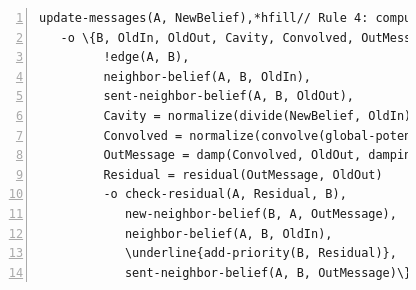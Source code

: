 \begin{figure}[h!]
\begin{Verbatim}[numbers=left,commandchars=\\\{\},fontsize=\codesize]
update-messages(A, NewBelief),*hfill// Rule 4: compute belief to be sent to a neighbor node
   -o \{B, OldIn, OldOut, Cavity, Convolved, OutMessage, Residual |
         !edge(A, B),
         neighbor-belief(A, B, OldIn),
         sent-neighbor-belief(A, B, OldOut),
         Cavity = normalize(divide(NewBelief, OldIn)),
         Convolved = normalize(convolve(global-potential, Cavity)),
         OutMessage = damp(Convolved, OldOut, damping)
         Residual = residual(OutMessage, OldOut)
         -o check-residual(A, Residual, B),
            new-neighbor-belief(B, A, OutMessage),
            neighbor-belief(A, B, OldIn),
            \underline{add-priority(B, Residual)},
            sent-neighbor-belief(A, B, OutMessage)\}.
\end{Verbatim}
\label{code:coordination:improved_bp}
\end{figure}
